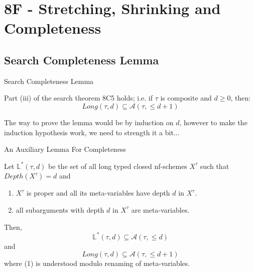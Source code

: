 \section{8F - Stretching, Shrinking and Completeness}

\subsection{Search Completeness Lemma}
\begin{frame}{Search Completeness Lemma}
\begin{lemma}[8F1 in Hindley's]
Part (iii) of the search theorem 8C5 holds; i.e. if $\tau$ is composite and $d \ge 0$, then:
\begin{equation*}
    Long(\tau, d) \subseteq \mathcal{A}(\tau, \le  d+1)
\end{equation*}
\end{lemma}

\medskip 

The way to prove the lemma would be by induction on $d$, however to make the induction hypothesis work, we need to strength it a bit...
\end{frame}

\begin{frame}{An Auxiliary Lemma For Completeness}
\begin{lemma}
\label{aux_completeness}
Let $\mathbb{L}^{*}(\tau, d)$ be the set of all long typed closed nf-schemes $X^\tau$ such that $Depth(X^\tau)=d$ and 
\begin{enumerate}
    \item $X^\tau$ is proper and all its meta-variables have depth $d$ in $X^\tau$.
    \item all subarguments with depth $d$ in $X^\tau$ are meta-variables. 
\end{enumerate}

Then,
\setcounter{equation}{0}
\begin{equation}
\mathbb{L}^{*}(\tau, d) \subseteq \mathcal{A}(\tau, \le d)
\end{equation}
and 
\begin{equation}
Long(\tau, d) \subseteq \mathcal{A}(\tau, \le d+1)
\end{equation}
where (1) is understood modulo renaming of meta-variables. 
\end{lemma}
\end{frame}

